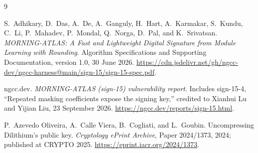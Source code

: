 \documentclass[11pt,a4paper]{article}
\begin{document}
\begin{thebibliography}{9}
\small

S.~Adhikary, D.~Das, A.~De, A.~Ganguly, H.~Hart, A.~Karmakar,
S.~Kundu, C.~Li, P.~Mahadev, P.~Mondal, Q.~Norga, D.~Pal, and
K.~Srivatsan.
\newblock \emph{MORNING-ATLAS: A Fast and Lightweight Digital Signature from
Module Learning with Rounding}.
\newblock Algorithm Specifications and Supporting Documentation, version 1.0,
30 June 2026.
\newblock \url{https://cdn.jsdelivr.net/gh/ngcc-dev/ngcc-harness@main/sign-15/sign-15-spec.pdf}.

ngcc.dev.
\newblock \emph{MORNING-ATLAS (sign-15) vulnerability report}.
\newblock Includes sign-15-4, ``Repeated masking coefficients expose the
signing key,'' credited to Xianhui Lu and Yijian Liu, 23 September 2026.
\newblock \url{https://ngcc.dev/reports/sign-15.html}.

P.~Azevedo Oliveira, A.~Calle Viera, B.~Cogliati, and L.~Goubin.
\newblock Uncompressing Dilithium's public key.
\newblock \emph{Cryptology ePrint Archive}, Paper 2024/1373, 2024;
published at CRYPTO 2025.
\newblock \url{https://eprint.iacr.org/2024/1373}.

\end{thebibliography}
\end{document}
